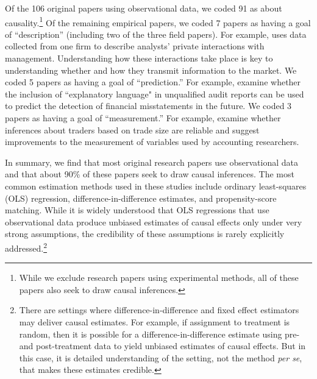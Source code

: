 \documentclass[11pt,reqno,titlepage]{amsart}
\begin{document}
\begin{doublespace}
Of the 106 original papers using observational data, we coded 91 as about causality.\footnote{While we exclude research papers using experimental methods, all of these papers also seek to draw causal inferences.}
Of the remaining empirical papers, we coded 7 papers as having a goal of ``description'' (including two of the three field papers). 
For example, \citet{Soltes:2013ba} uses data collected from one firm to describe analysts' private interactions with management. Understanding how these interactions take place is key to understanding whether and how they transmit information to the market.
We coded 5 papers as having a goal of ``prediction.'' 
For example, \citet{Czerney:2014bv} examine whether the inclusion of ``explanatory language" in unqualified audit reports can be used to predict the detection of financial misstatements in the future.
We coded 3 papers as having a goal of ``measurement.'' 
For example, \citet{Cready:2014ji} examine whether inferences about traders based on trade size are reliable and suggest improvements to the measurement of variables used by accounting researchers.

In summary, we find that most original research papers use observational data and that about 90\% of these papers seek to draw causal inferences.
The most common estimation methods used in these studies include ordinary least-squares (OLS) regression, difference-in-difference estimates, and propensity-score matching.
While it is widely understood that OLS regressions that use observational data produce unbiased estimates of causal effects only under very strong assumptions, the credibility of these assumptions is rarely explicitly addressed.\footnote{
There are settings where difference-in-difference and fixed effect estimators may deliver causal estimates.
For example, if assignment to treatment is random, then it is possible for a difference-in-difference estimate using pre- and post-treatment data to yield unbiased estimates of causal effects.
But in this case, it is detailed understanding of the setting, not the method \emph{per se}, that makes these estimates credible.}


\end{doublespace}
\end{document}
